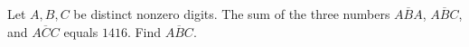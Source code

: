 Let $A, B, C$ be distinct nonzero digits. The sum of the three numbers $\overline{ABA}$, $\overline{ABC}$, and $\overline{ACC}$ equals $1416$. Find $\overline{ABC}$.
